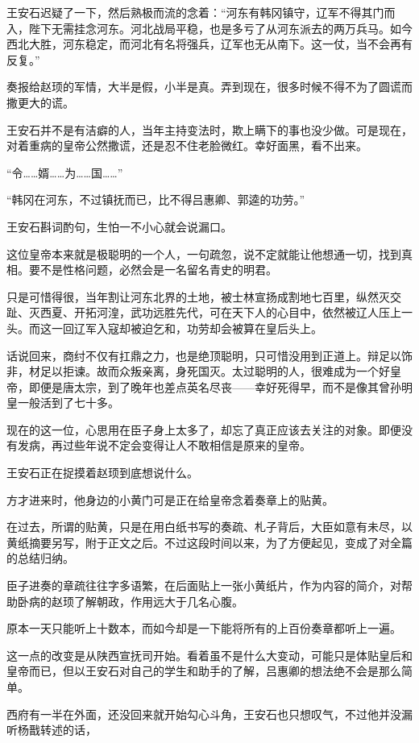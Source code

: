 王安石迟疑了一下，然后熟极而流的念着：“河东有韩冈镇守，辽军不得其门而入，陛下无需挂念河东。河北战局平稳，也是多亏了从河东派去的两万兵马。如今西北大胜，河东稳定，而河北有名将强兵，辽军也无从南下。这一仗，当不会再有反复。”

奏报给赵顼的军情，大半是假，小半是真。弄到现在，很多时候不得不为了圆谎而撒更大的谎。

王安石并不是有洁癖的人，当年主持变法时，欺上瞒下的事也没少做。可是现在，对着重病的皇帝公然撒谎，还是忍不住老脸微红。幸好面黑，看不出来。

“令……婿……为……国……”

“韩冈在河东，不过镇抚而已，比不得吕惠卿、郭逵的功劳。”

王安石斟词酌句，生怕一不小心就会说漏口。

这位皇帝本来就是极聪明的一个人，一句疏忽，说不定就能让他想通一切，找到真相。要不是性格问题，必然会是一名留名青史的明君。

只是可惜得很，当年割让河东北界的土地，被士林宣扬成割地七百里，纵然灭交趾、灭西夏、开拓河湟，武功远胜先代，可在天下人的心目中，依然被辽人压上一头。而这一回辽军入寇却被迫乞和，功劳却会被算在皇后头上。

话说回来，商纣不仅有扛鼎之力，也是绝顶聪明，只可惜没用到正道上。辩足以饰非，材足以拒谏。故而众叛亲离，身死国灭。太过聪明的人，很难成为一个好皇帝，即便是唐太宗，到了晚年也差点英名尽丧——幸好死得早，而不是像其曾孙明皇一般活到了七十多。

现在的这一位，心思用在臣子身上太多了，却忘了真正应该去关注的对象。即便没有发病，再过些年说不定会变得让人不敢相信是原来的皇帝。

王安石正在捉摸着赵顼到底想说什么。

方才进来时，他身边的小黄门可是正在给皇帝念着奏章上的贴黄。

在过去，所谓的贴黄，只是在用白纸书写的奏疏、札子背后，大臣如意有未尽，以黄纸摘要另写，附于正文之后。不过这段时间以来，为了方便起见，变成了对全篇的总结归纳。

臣子进奏的章疏往往字多语繁，在后面贴上一张小黄纸片，作为内容的简介，对帮助卧病的赵顼了解朝政，作用远大于几名心腹。

原本一天只能听上十数本，而如今却是一下能将所有的上百份奏章都听上一遍。

这一点的改变是从陕西宣抚司开始。看着虽不是什么大变动，可能只是体贴皇后和皇帝而已，但以王安石对自己的学生和助手的了解，吕惠卿的想法绝不会是那么简单。

西府有一半在外面，还没回来就开始勾心斗角，王安石也只想叹气，不过他并没漏听杨戬转述的话，

